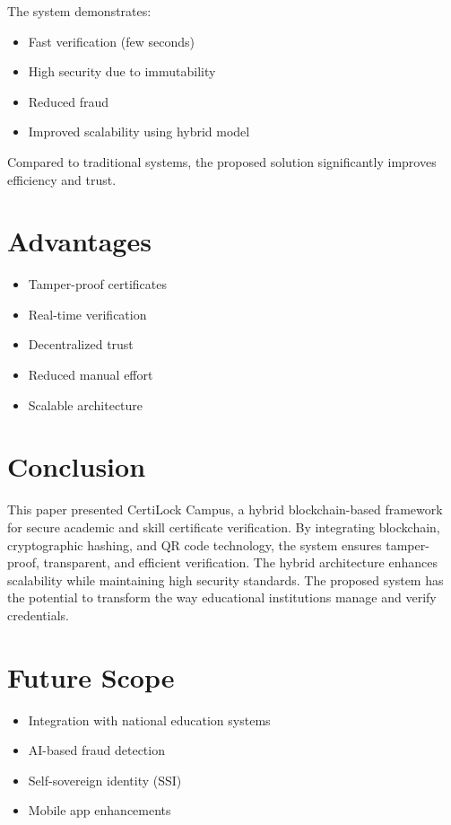 \documentclass[conference]{IEEEtran}
\begin{document}
The system demonstrates:
\begin{itemize}
\item Fast verification (few seconds)
\item High security due to immutability
\item Reduced fraud
\item Improved scalability using hybrid model
\end{itemize}

Compared to traditional systems, the proposed solution significantly improves efficiency and trust.

\section{Advantages}

\begin{itemize}
\item Tamper-proof certificates
\item Real-time verification
\item Decentralized trust
\item Reduced manual effort
\item Scalable architecture
\end{itemize}

\section{Conclusion}

This paper presented CertiLock Campus, a hybrid blockchain-based framework for secure academic and skill certificate verification. By integrating blockchain, cryptographic hashing, and QR code technology, the system ensures tamper-proof, transparent, and efficient verification. The hybrid architecture enhances scalability while maintaining high security standards. The proposed system has the potential to transform the way educational institutions manage and verify credentials.

\section{Future Scope}

\begin{itemize}
\item Integration with national education systems
\item AI-based fraud detection
\item Self-sovereign identity (SSI)
\item Mobile app enhancements
\end{itemize}
\end{document}
